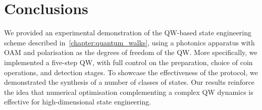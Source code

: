 \section{Conclusions}
\label{sec:expQWs:conclusions}

We provided an experimental demonstration of the \ac{QW}-based state engineering scheme described in~\cref{chapter:quantum_walks}, using a photonics apparatus with \ac{OAM} and polarisation as the degrees of freedom of the \ac{QW}.
More specifically, we implemented a five-step \ac{QW}, with full control on the preparation, choice of coin operations, and detection stages. To showcase the effectiveness of the protocol, we demonstrated the synthesis of a number of classes of states.
Our results reinforce the idea that numerical optimisation complementing a complex \ac{QW} dynamics is effective for high-dimensional state engineering.
